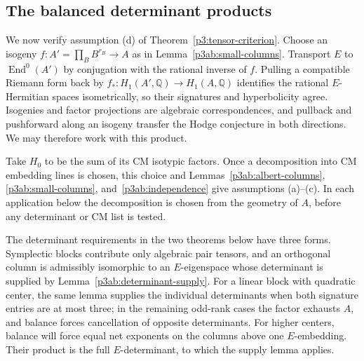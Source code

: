 \documentclass[11pt]{article}
\newcommand{\Q}{\mathbb Q}
\numberwithin{equation}{section}
\begin{document}
\subsection{The balanced determinant products}

We now verify assumption \textnormal{(d)} of
Theorem~\ref{p3:tensor-criterion}.  Choose an isogeny
\(f:A'=\prod_B B^{r_B}\to A\) as in
Lemma~\ref{p3ab:small-columns}.  Transport \(E\) to
\(\operatorname{End}^0(A')\) by conjugation with the rational
inverse of \(f\).  Pulling a compatible Riemann form back by
\(f_*:H_1(A',\Q)\to H_1(A,\Q)\) identifies the rational
\(E\)-Hermitian spaces isometrically, so their signatures and
hyperbolicity agree.  Isogenies and factor projections are algebraic
correspondences, and pullback and pushforward along an isogeny
transfer the Hodge conjecture in both directions.  We may therefore
work with this product.

Take \(H_0\) to be the sum of its CM isotypic factors.  Once a
decomposition into CM embedding lines is chosen, this choice and
Lemmas~\ref{p3ab:albert-columns}, \ref{p3ab:small-columns},
and~\ref{p3ab:independence} give assumptions
\textnormal{(a)--(c)}.  In each application below the decomposition
is chosen from the geometry of \(A\), before any determinant or CM
list is tested.

The determinant requirements in the two theorems below have three
forms.  Symplectic blocks contribute only algebraic pair tensors,
and an orthogonal column is admissibly isomorphic to an
\(E\)-eigenspace whose determinant is supplied by
Lemma~\ref{p3ab:determinant-supply}.  For a linear
block with quadratic center, the same lemma supplies the individual
determinants when both signature entries are at most three; in
the remaining odd-rank cases the factor exhausts \(A\), and balance
forces cancellation of opposite determinants.  For higher centers,
balance will force equal net exponents on the columns above one
\(E\)-embedding.  Their product is the full \(E\)-determinant,
to which the supply lemma applies.
\end{document}

